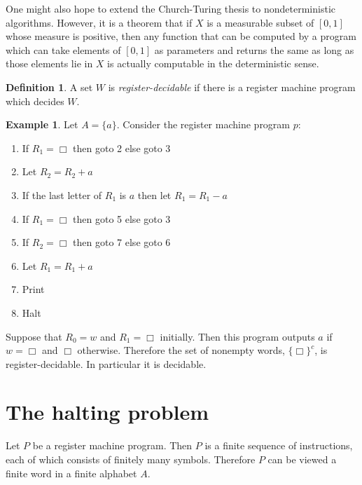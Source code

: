\documentclass[12pt]{report}
\newcommand{\dfn}[1]{\emph{#1}\index{#1}}
\theoremstyle{definition}
\newtheorem{definition}[theorem]{Definition}
\newtheorem{example}[theorem]{Example}
\begin{document}
One might also hope to extend the Church-Turing thesis to nondeterministic algorithms. However, it is a theorem that if $X$ is a measurable subset of $[0, 1]$ whose measure is positive, then any function that can be computed by a program which can take elements of $[0, 1]$ as parameters and returns the same as long as those elements lie in $X$ is actually computable in the deterministic sense.
\begin{definition}
A set $W$ is \dfn{register-decidable} if there is a register machine program which decides $W$.
\end{definition}
\begin{example}
Let $A = \{a\}$. Consider the register machine program $p$:
\begin{enumerate}
\item If $R_1 = \Box$ then goto 2 else goto 3
\item Let $R_2 = R_2 + a$
\item If the last letter of $R_1$ is $a$ then let $R_1 = R_1 - a$
\item If $R_1 = \Box$ then goto 5 else goto 3
\item If $R_2 = \Box$ then goto 7 else goto 6
\item Let $R_1 = R_1 + a$
\item Print
\item Halt
\end{enumerate}
Suppose that $R_0 = w$ and $R_1 = \Box$ initially. Then this program outputs $a$ if $w = \Box$ and $\Box$ otherwise. Therefore the set of nonempty words, $\{\Box\}^c$, is register-decidable. In particular it is decidable.
\end{example}

\section{The halting problem}
Let $P$ be a register machine program. Then $P$ is a finite sequence of instructions, each of which consists of finitely many symbols. Therefore $P$ can be viewed a finite word in a finite alphabet $A$.
\end{document}
